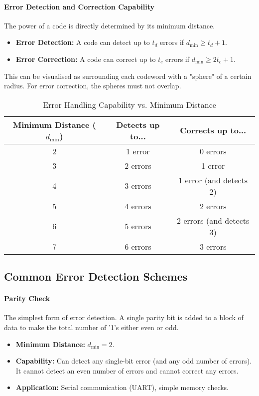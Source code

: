 \paragraph{Error Detection and Correction Capability}
The power of a code is directly determined by its minimum distance.
\begin{itemize}
    \item \textbf{Error Detection:} A code can detect up to $t_d$ errors if $d_{\min} \ge t_d + 1$.
    \item \textbf{Error Correction:} A code can correct up to $t_c$ errors if $d_{\min} \ge 2t_c + 1$.
\end{itemize}
This can be visualised as surrounding each codeword with a "sphere" of a certain radius. For error correction, the spheres must not overlap.

\begin{table}[H]
    \centering
    \caption{Error Handling Capability vs. Minimum Distance}
    \label{tab:dmin-capability}
    \begin{tabular}{@{}ccc@{}}
        \toprule
        \tableheaderfont Minimum Distance ($d_{\min}$) & \tableheaderfont Detects up to... & \tableheaderfont Corrects up to... \\
        \midrule
        2 & 1 error & 0 errors \\
        3 & 2 errors & 1 error \\
        4 & 3 errors & 1 error (and detects 2) \\
        5 & 4 errors & 2 errors \\
        6 & 5 errors & 2 errors (and detects 3) \\
        7 & 6 errors & 3 errors \\
        \bottomrule
    \end{tabular}
\end{table}


\subsection{Common Error Detection Schemes}

\paragraph{Parity Check}
The simplest form of error detection. A single parity bit is added to a block of data to make the total number of '1's either even or odd.
\begin{itemize}
    \item \textbf{Minimum Distance:} $d_{\min} = 2$.
    \item \textbf{Capability:} Can detect any single-bit error (and any odd number of errors). It cannot detect an even number of errors and cannot correct any errors.
    \item \textbf{Application:} Serial communication (UART), simple memory checks.
\end{itemize}

